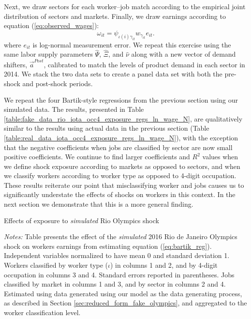 \documentclass[12pt]{article}
\def\g{\gamma}
\def\i{\iota}
\theoremstyle{definition}
\theoremstyle{plain}
\begin{document}
Next, we draw sectors for each worker--job match according to the empirical joint distribution of sectors and markets. Finally, we draw earnings according to equation (\ref{eq:observed_wages}):
\[\omega_{it} = \psi_{\i(i)\g_{it}} w_{\g_{it}} e_{it}. \]
where $e_{it}$ is log-normal measurement error. We repeat this exercise using the same labor supply parameters $\hat \Psi$, $\hat \Xi$, and $\hat \nu$ along with a new vector of demand shifters, $\vec{a}^{Post}$, calibrated to match the levels of product demand in each sector in 2014. We stack the two data sets to create a panel data set with both the pre-shock and post-shock periods. %



We repeat the four Bartik-style regressions from the previous section using our simulated data. The results, presented in Table \ref{table:fake_data_rio_iota_occ4_exposure_regs_ln_wage_N}, are qualitatively similar to the results using actual data in the previous section (Table \ref{table:real_data_iota_occ4_exposure_regs_ln_wage_N}), with the exception that the negative coefficients when jobs are classified by sector are now small positive coefficients. We continue to find larger coefficients and $R^2$ values when we define shock exposure according to markets as opposed to sectors, and when we classify workers according to worker type as opposed to 4-digit occupation. These results reiterate our point that misclassifying worker and jobs causes us to significantly understate the effects of shocks on workers in this context. In the next section we demonstrate that this is a more general finding. 



\begin{table}
	\centering
	\caption{Effects of exposure to \emph{simulated} Rio Olympics shock}
	
	\label{table:fake_data_rio_iota_occ4_exposure_regs_ln_wage_N}
		\footnotesize\flushleft \emph{Notes:} Table presents the effect of the \emph{simulated} 2016 Rio de Janeiro Olympics shock on workers earnings from estimating equation (\ref{eq:bartik_reg}). Independent variables normalized to have mean 0 and standard deviation 1. Workers classified by worker type ($\i$) in columns 1 and 2, and by 4-digit occupation in columns 3 and 4. Standard errors reported in parentheses. Jobs classified by market in columns 1 and 3, and by sector in columns 2 and 4. Estimated using data generated using our model as the data generating process, as described  in Section \ref{sec:reduced_form_fake_olympics}, and aggregated to the worker classification level. 
\end{table}
\end{document}
